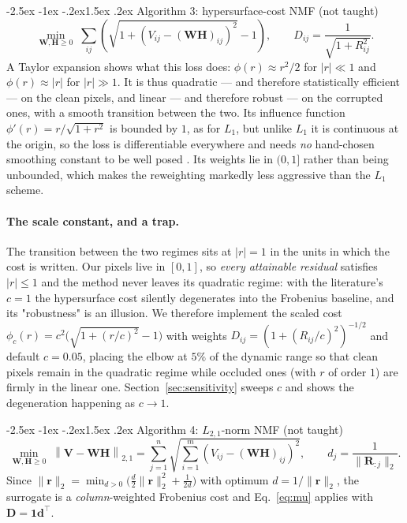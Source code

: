 \documentclass[12pt,a4paper]{article}
\makeatletter
\renewcommand\subsection{\@startsection{subsection}{2}{\z@}%
    {-2.5ex \@plus -1ex \@minus -.2ex}{1.5ex \@plus.2ex}%
    {\normalfont\fontsize{12}{14}\bfseries}}
\newcommand{\bV}{\bm{V}}
\newcommand{\bW}{\bm{W}}
\newcommand{\bH}{\bm{H}}
\newcommand{\bD}{\bm{D}}
\newcommand{\bR}{\bm{R}}
\newcommand{\Ltwoone}[1]{\left\lVert #1 \right\rVert_{2,1}}
\makeatother
\begin{document}
\subsection{Algorithm 3: hypersurface-cost NMF (not taught)}
\label{sec:alg-hypersurface}
\begin{equation}
  \min_{\bW,\bH \ge 0} \; \sum_{ij}
  \left( \sqrt{1 + \left(V_{ij}-(\bW\bH)_{ij}\right)^{2}} - 1 \right),
  \qquad D_{ij} = \frac{1}{\sqrt{1+R_{ij}^{2}}} .
\end{equation}
A Taylor expansion shows what this loss does: $\phi(r) \approx r^{2}/2$ for
$|r| \ll 1$ and $\phi(r) \approx |r|$ for $|r| \gg 1$. It is thus quadratic
--- and therefore statistically efficient --- on the clean pixels, and linear
--- and therefore robust --- on the corrupted ones, with a smooth transition
between the two. Its influence function $\phi'(r) = r/\sqrt{1+r^{2}}$ is
bounded by $1$, as for $L_1$, but unlike $L_1$ it is continuous at the origin,
so the loss is differentiable everywhere and needs \emph{no} hand-chosen
smoothing constant to be well posed \citep{hamza2006reconstruction}. Its
weights lie in $(0,1]$ rather than being unbounded, which makes the
reweighting markedly less aggressive than the $L_1$ scheme.

\paragraph{The scale constant, and a trap.} The transition between the two
regimes sits at $|r| = 1$ in the units in which the cost is written. Our
pixels live in $[0,1]$, so \emph{every attainable residual} satisfies
$|r| \le 1$ and the method never leaves its quadratic regime: with the
literature's $c = 1$ the hypersurface cost silently degenerates into the
Frobenius baseline, and its "robustness" is an illusion. We therefore
implement the scaled cost
$\phi_c(r) = c^{2}\big(\sqrt{1 + (r/c)^{2}} - 1\big)$ with weights
$D_{ij} = (1 + (R_{ij}/c)^{2})^{-1/2}$ and default $c = 0.05$, placing the
elbow at $5\%$ of the dynamic range so that clean pixels remain in the
quadratic regime while occluded ones (with $r$ of order $1$) are firmly in the
linear one. Section~\ref{sec:sensitivity} sweeps $c$ and shows the
degeneration happening as $c \to 1$.

\subsection{Algorithm 4: $L_{2,1}$-norm NMF (not taught)}
\begin{equation}
  \min_{\bW,\bH \ge 0} \; \Ltwoone{\bV - \bW\bH}
  = \sum_{j=1}^{n} \sqrt{\sum_{i=1}^{m} \left(V_{ij}-(\bW\bH)_{ij}\right)^{2}},
  \qquad d_{j} = \frac{1}{\lVert \bR_{:j}\rVert_{2}} .
\end{equation}
Since $\lVert \bm{r}\rVert_{2} = \min_{d>0}\big(\tfrac{d}{2}\lVert
\bm{r}\rVert_{2}^{2} + \tfrac{1}{2d}\big)$ with optimum
$d = 1/\lVert\bm{r}\rVert_{2}$, the surrogate is a \emph{column}-weighted
Frobenius cost and Eq.~\eqref{eq:mu} applies with $\bD = \mathbf{1}\bm{d}^{\top}$.
\end{document}
